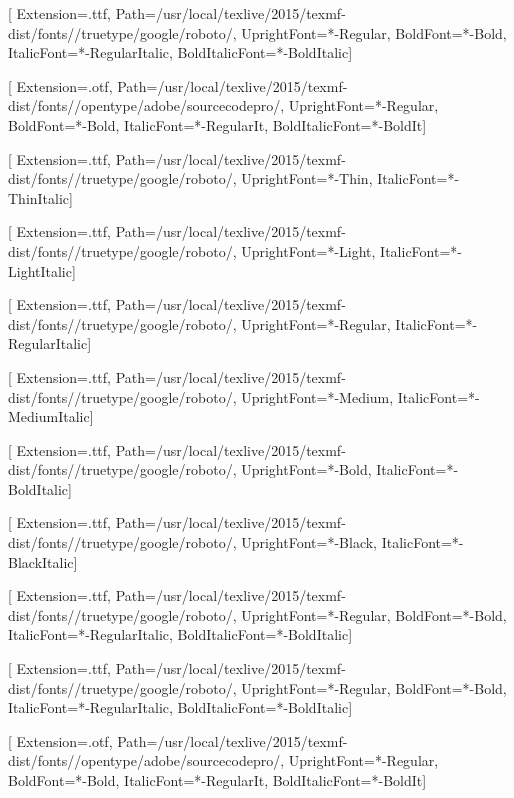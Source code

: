 
\newcommand{\fontdir}[0]{/usr/local/texlive/2015/texmf-dist/fonts/}
\newcommand{\robotodir}[0]{\fontdir/truetype/google/roboto/}
\newcommand{\sourcecodeprodir}[0]{\fontdir/opentype/adobe/sourcecodepro/}

\newfontfamily{}[
  Extension=.ttf,
  Path=\robotodir,
  UprightFont=*-Regular,
  BoldFont=*-Bold,
  ItalicFont=*-RegularItalic,
  BoldItalicFont=*-BoldItalic]

\newfontfamily{}[
  Extension=.otf,
  Path=\sourcecodeprodir,
  UprightFont=*-Regular,
  BoldFont=*-Bold,
  ItalicFont=*-RegularIt,
  BoldItalicFont=*-BoldIt]

\newfontfamily{}[
  Extension=.ttf,
  Path=\robotodir,
  UprightFont=*-Thin,
  ItalicFont=*-ThinItalic]

\newfontfamily{}[
  Extension=.ttf,
  Path=\robotodir,
  UprightFont=*-Light,
  ItalicFont=*-LightItalic]

\newfontfamily{}[
  Extension=.ttf,
  Path=\robotodir,
  UprightFont=*-Regular,
  ItalicFont=*-RegularItalic]

\newfontfamily{}[
  Extension=.ttf,
  Path=\robotodir,
  UprightFont=*-Medium,
  ItalicFont=*-MediumItalic]

\newfontfamily{}[
  Extension=.ttf,
  Path=\robotodir,
  UprightFont=*-Bold,
  ItalicFont=*-BoldItalic]

\newfontfamily{}[
  Extension=.ttf,
  Path=\robotodir,
  UprightFont=*-Black,
  ItalicFont=*-BlackItalic]

\setmainfont{Roboto}[
  Extension=.ttf,
  Path=\robotodir,
  UprightFont=*-Regular,
  BoldFont=*-Bold,
  ItalicFont=*-RegularItalic,
  BoldItalicFont=*-BoldItalic]

\setsansfont{Roboto}[
  Extension=.ttf,
  Path=\robotodir,
  UprightFont=*-Regular,
  BoldFont=*-Bold,
  ItalicFont=*-RegularItalic,
  BoldItalicFont=*-BoldItalic]

\setmonofont{SourceCodePro}[
  Extension=.otf,
  Path=\sourcecodeprodir,
  UprightFont=*-Regular,
  BoldFont=*-Bold,
  ItalicFont=*-RegularIt,
  BoldItalicFont=*-BoldIt]

